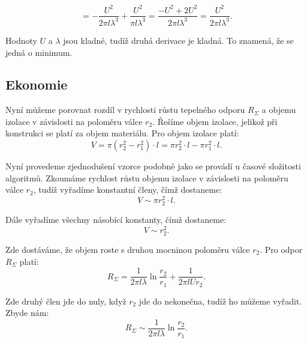 \documentclass{article}
\begin{document}
$$
    = -\frac{U^2}{2 \pi l \lambda^3} + \frac{U^2}{\pi l \lambda^3} = \frac{-U^2 + 2 U^2}{2 \pi l \lambda^3} = \frac{U^2}{2 \pi l \lambda^3}.
$$

Hodnoty $U$ a $\lambda$ jsou kladné, tudíž druhá derivace je kladná. To znamená, že se jedná o minimum.

\begin{center}
\end{center}


\subsection{Ekonomie}

Nyní můžeme porovnat rozdíl v rychlosti růstu tepelného odporu $R_\Sigma$ a objemu izolace v závislosti na poloměru válce $r_2$. Řešíme objem izolace, jelikož při konstrukci se platí za objem materiálu. Pro objem izolace platí:
$$
    V = \pi (r_2^2 - r_1^2) \cdot l = \pi r_2^2 \cdot l - \pi r_1^2 \cdot l.
$$

Nyní provedeme zjednodušení vzorce podobně jako se provádí u časové složitosti algoritmů. Zkoumáme rychlost růstu objemu izolace v závislosti na poloměru válce $r_2$, tudíž vyřadíme konstantní členy, čímž dostaneme:
$$
    V \sim \pi r_2^2 \cdot l.
$$

Dále vyřadíme všechny násobící konstanty, čímž dostaneme:
$$
    V \sim r_2^2.
$$

Zde dostáváme, že objem roste s druhou mocninou poloměru válce $r_2$. Pro odpor $R_\Sigma$ platí:
$$
    R_\Sigma = \frac{1}{2 \pi l \lambda} \ln \frac{r_2}{r_1} + \frac{1}{2 \pi l U r_2}.
$$

Zde druhý člen jde do nuly, když $r_2$ jde do nekonečna, tudíž ho můžeme vyřadit. Zbyde nám:
$$
    R_\Sigma \sim \frac{1}{2 \pi l \lambda} \ln \frac{r_2}{r_1}.
$$
\end{document}
